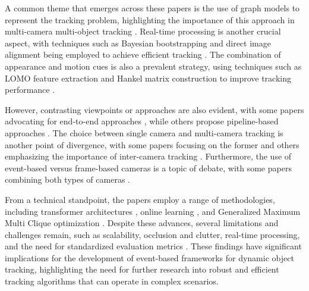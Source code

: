 \documentclass[conference]{IEEEtran}
\begin{document}
A common theme that emerges across these papers is the use of graph models to represent the tracking problem, highlighting the importance of this approach in multi-camera multi-object tracking \cite{An equalised global graphical model-based approach for multi-camera object tracking}. Real-time processing is another crucial aspect, with techniques such as Bayesian bootstrapping and direct image alignment being employed to achieve efficient tracking \cite{Tracking 6-DoF Object Motion from Events and Frames}. The combination of appearance and motion cues is also a prevalent strategy, using techniques such as LOMO feature extraction and Hankel matrix construction to improve tracking performance \cite{Multi-camera Multi-Object Tracking}.

However, contrasting viewpoints or approaches are also evident, with some papers advocating for end-to-end approaches \cite{MCTR: Multi-Camera Tracking Transformer}, while others propose pipeline-based approaches \cite{Multi-camera Multi-Object Tracking}. The choice between single camera and multi-camera tracking is another point of divergence, with some papers focusing on the former \cite{e-TLD: Event-based Framework for Dynamic Object Tracking} and others emphasizing the importance of inter-camera tracking \cite{An equalised global graphical model-based approach for multi-camera object tracking}. Furthermore, the use of event-based versus frame-based cameras is a topic of debate, with some papers combining both types of cameras \cite{Tracking 6-DoF Object Motion from Events and Frames}.

From a technical standpoint, the papers employ a range of methodologies, including transformer architectures \cite{MCTR: Multi-Camera Tracking Transformer}, online learning \cite{e-TLD: Event-based Framework for Dynamic Object Tracking}, and Generalized Maximum Multi Clique optimization \cite{Multi-camera Multi-Object Tracking}. Despite these advances, several limitations and challenges remain, such as scalability, occlusion and clutter, real-time processing, and the need for standardized evaluation metrics \cite{MCTR: Multi-Camera Tracking Transformer}. These findings have significant implications for the development of event-based frameworks for dynamic object tracking, highlighting the need for further research into robust and efficient tracking algorithms that can operate in complex scenarios.
\end{document}

